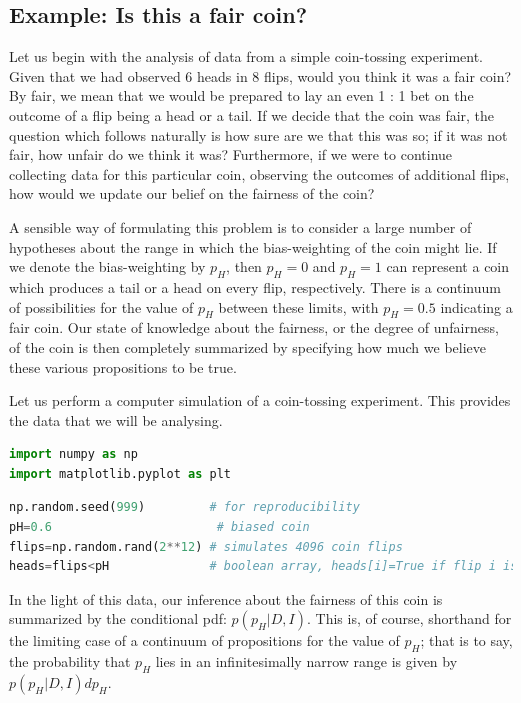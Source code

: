 \documentclass[%
oneside,                 %
final,                   %
10pt]{article}
\begin{document}
\subsection{Example: Is this a fair coin?}
Let us begin with the analysis of data from a simple coin-tossing experiment. 
Given that we had observed 6 heads in 8 flips, would you think it was a fair coin? By fair, we mean that we would be prepared to lay an even 1 : 1 bet on the outcome of a flip being a head or a tail. If we decide that the coin was fair, the question which follows naturally is how sure are we that this was so; if it was not fair, how unfair do we think it was? Furthermore, if we were to continue collecting data for this particular coin, observing the outcomes of additional flips, how would we update our belief on the fairness of the coin?

A sensible way of formulating this problem is to consider a large number of hypotheses about the range in which the bias-weighting of the coin might lie. If we denote the bias-weighting by $p_H$, then $p_H = 0$ and $p_H = 1$ can represent a coin which produces a tail or a head on every flip, respectively. There is a continuum of possibilities for the value of $p_H$ between these limits, with $p_H = 0.5$ indicating a fair coin. Our state of knowledge about the fairness, or the degree of unfairness, of the coin is then completely summarized by specifying how much we believe these various propositions to be true. 

Let us perform a computer simulation of a coin-tossing experiment. This provides the data that we will be analysing.

\begin{lstlisting}[language=Python,style=blue1]
import numpy as np
import matplotlib.pyplot as plt
\end{lstlisting}

\begin{lstlisting}[language=Python,style=blue1]
np.random.seed(999)         # for reproducibility
pH=0.6                       # biased coin
flips=np.random.rand(2**12) # simulates 4096 coin flips
heads=flips<pH              # boolean array, heads[i]=True if flip i is heads
\end{lstlisting}

In the light of this data, our inference about the fairness of this coin is summarized by the conditional pdf: $p(p_H|D,I)$. This is, of course, shorthand for the limiting case of a continuum of propositions for the value of $p_H$; that is to say, the probability that $p_H$ lies in an infinitesimally narrow range is given by $p(p_H|D,I) dp_H$. 
\end{document}
